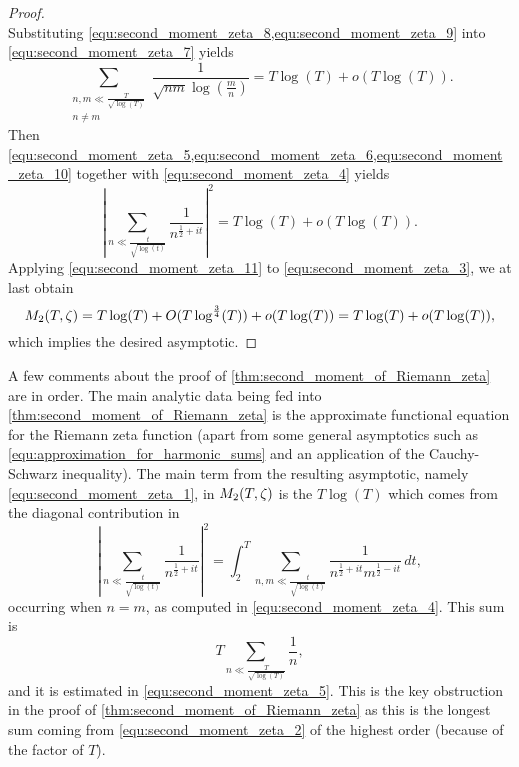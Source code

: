 \begin{proof}
\begin{equation}
      \end{equation}
      Substituting \cref{equ:second_moment_zeta_8,equ:second_moment_zeta_9} into \cref{equ:second_moment_zeta_7} yields
      \begin{equation}\label{equ:second_moment_zeta_10}
        \sum_{\substack{n,m \ll \frac{T}{\sqrt{\log(T)}} \\ n \neq m}}\frac{1}{\sqrt{nm}\log\left(\frac{m}{n}\right)} = T\log(T)+o(T\log(T)).
      \end{equation}
      Then \cref{equ:second_moment_zeta_5,equ:second_moment_zeta_6,equ:second_moment_zeta_10} together with \cref{equ:second_moment_zeta_4} yields
      \begin{equation}\label{equ:second_moment_zeta_11}
        \left|\sum_{n \ll \frac{t}{\sqrt{\log(t)}}}\frac{1}{n^{\frac{1}{2}+it}}\right|^{2} = T\log(T)+o(T\log(T)).
      \end{equation}
      Applying \cref{equ:second_moment_zeta_11} to \cref{equ:second_moment_zeta_3}, we at last obtain
      \[
        M_{2}(T,\zeta) = T\log(T)+O(T\log^{\frac{3}{4}}(T))+o(T\log(T)) = T\log(T)+o(T\log(T)),
      \]
      which implies the desired asymptotic.
    \end{proof}
    
    A few comments about the proof of \cref{thm:second_moment_of_Riemann_zeta} are in order. The main analytic data being fed into \cref{thm:second_moment_of_Riemann_zeta} is the approximate functional equation for the Riemann zeta function (apart from some general asymptotics such as \cref{equ:approximation_for_harmonic_sums} and an application of the Cauchy-Schwarz inequality). The main term from the resulting asymptotic, namely \cref{equ:second_moment_zeta_1}, in $M_{2}(T,\zeta)$ is the $T\log(T)$ which comes from the diagonal contribution in
    \[
      \left|\sum_{n \ll \frac{t}{\sqrt{\log(t)}}}\frac{1}{n^{\frac{1}{2}+it}}\right|^{2} = \int_{2}^{T}\sum_{n,m \ll \frac{t}{\sqrt{\log(t)}}}\frac{1}{n^{\frac{1}{2}+it}m^{\frac{1}{2}-it}}\,dt,
    \]
    occurring when $n = m$, as computed in \cref{equ:second_moment_zeta_4}. This sum is
    \[
      T\sum_{n \ll \frac{T}{\sqrt{\log(T)}}}\frac{1}{n},
    \]
    and it is estimated in \cref{equ:second_moment_zeta_5}. This is the key obstruction in the proof of \cref{thm:second_moment_of_Riemann_zeta} as this is the longest sum coming from \cref{equ:second_moment_zeta_2} of the highest order (because of the factor of $T$).